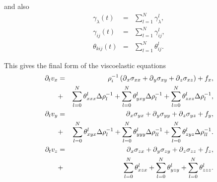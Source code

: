 \documentclass[11pt]{article}
\begin{document}
and also 
\begin{eqnarray}
  \gamma_{\lambda}(t) & = & \sum_{l=1}^N \gamma^l_{\lambda},   \nonumber\\
  \gamma_{ij}(t)      & = & \sum_{l=1}^N \gamma^l_{ij},        \nonumber\\
  \theta_{kij}(t)     & = & \sum_{l=1}^N \theta^l_{ij}.        \nonumber
                           \label{eq:gamma}
\end{eqnarray}

This gives the final form of the viscoelastic equations
%
\begin{eqnarray}
  \partial_t{v}_x 
     & = & \rho^{-1}_i\left(\mbox{$\partial$}_x \sigma_{xx} +\mbox{$\partial$}_y 
           \sigma_{xy} +\mbox{$\partial$}_z \sigma_{xz}\right) + f_x,       \nonumber\\
     & + & \sum_{l=0}^N\theta^l_{xxx}\Delta\rho^{-1}_{l} 
           +  \sum_{l=0}^N\theta^l_{yxy}\Delta\rho^{-1}_{l} 
           +  \sum_{l=0}^N\theta^l_{zxz}\Delta\rho^{-1}_{l}, \nonumber\\ 
  \partial_t{v}_y 
     & = & \mbox{$\partial$}_x \sigma_{yx} +\mbox{$\partial$}_y \sigma_{yy} +\mbox{$\partial$}_z 
           \sigma_{yz} + f_y,                                \nonumber\\
     & + & \sum_{l=0}^N\theta^l_{xyx}\Delta\rho^{-1}_{l} 
           +  \sum_{l=0}^N\theta^l_{yyy}\Delta\rho^{-1}_{ll} 
           +  \sum_{l=0}^N\theta^l_{zyz}\Delta\rho^{-1}_{ll}.\nonumber\\ 
  \partial_t{v}_z 
    & = & \mbox{$\partial$}_x \sigma_{zx} +\mbox{$\partial$}_y \sigma_{zy} 
          +\mbox{$\partial$}_z \sigma_{zz} + f_z,                           \nonumber\\
    & + & \sum_{l=0}^N\theta^l_{xzx} +  \sum_{l=0}^N\theta^l_{yzy} +  
          \sum_{l=0}^N\theta^l_{zzz}.                        \nonumber\\
\end{eqnarray}
\end{document}
